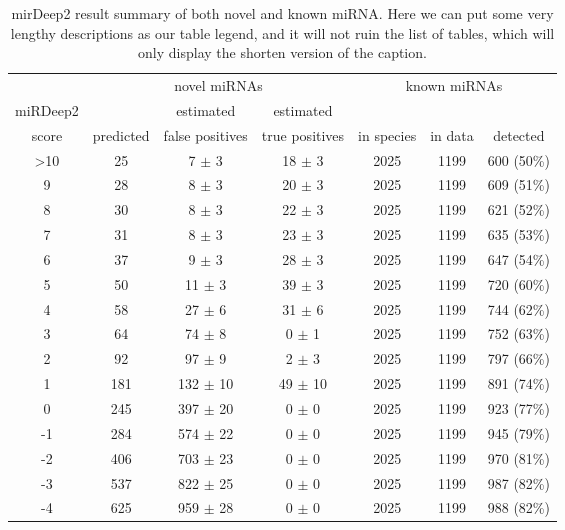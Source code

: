 \begin{table}[!htbp]
\caption[mirDeep2 result summary of both novel and known miRNA.]{mirDeep2 result summary of both novel and known miRNA. Here we can put some very lengthy descriptions as our table legend, and it will not ruin the list of tables, which will only display the shorten version of the caption.}
\label{t:all-sum}
\centering
\begin{threeparttable}
	\begin{tabular}{ccccccc}
	\toprule
    & \multicolumn{3}{c}{novel miRNAs} & \multicolumn{3}{c}{known miRNAs}\\
    \cmidrule(r){2-4} \cmidrule(r){5-7}
    miRDeep2 &       & estimated & estimated  &       &       &  \\
    score & predicted &  false positives\tnote{$\ast$} & true positives\tnote{$\dagger$} & in species & in data & detected\\
    \midrule
   >10    & 25    & 7 $\pm$ 3 & 18 $\pm$ 3 & 2025  & 1199  & 600 (50\%) \\
    9     & 28    & 8 $\pm$ 3 & 20 $\pm$ 3 & 2025  & 1199  & 609 (51\%) \\
    8     & 30    & 8 $\pm$ 3 & 22 $\pm$ 3 & 2025  & 1199  & 621 (52\%) \\
    7     & 31    & 8 $\pm$ 3 & 23 $\pm$ 3 & 2025  & 1199  & 635 (53\%) \\
    6     & 37    & 9 $\pm$ 3 & 28 $\pm$ 3 & 2025  & 1199  & 647 (54\%) \\
    5     & 50    & 11 $\pm$ 3 & 39 $\pm$ 3  & 2025  & 1199  & 720 (60\%) \\
    4     & 58    & 27 $\pm$ 6 & 31 $\pm$ 6 & 2025  & 1199  & 744 (62\%) \\
    3     & 64    & 74 $\pm$ 8 & 0 $\pm$ 1 & 2025  & 1199  & 752 (63\%) \\
    2     & 92    & 97 $\pm$ 9 & 2 $\pm$ 3 & 2025  & 1199  & 797 (66\%) \\
    1     & 181   & 132 $\pm$ 10 & 49 $\pm$ 10 & 2025  & 1199  & 891 (74\%) \\
    0     & 245   & 397 $\pm$ 20 & 0 $\pm$ 0 & 2025  & 1199  & 923 (77\%) \\
    -1    & 284   & 574 $\pm$ 22 & 0 $\pm$ 0 & 2025  & 1199  & 945 (79\%) \\
    -2    & 406   & 703 $\pm$ 23 & 0 $\pm$ 0 & 2025  & 1199  & 970 (81\%) \\
    -3    & 537   & 822 $\pm$ 25 & 0 $\pm$ 0 & 2025  & 1199  & 987 (82\%) \\
    -4    & 625   & 959 $\pm$ 28 & 0 $\pm$ 0 & 2025  & 1199  & 988 (82\%) \\

\end{tabular}
\end{threeparttable}
\end{table}

